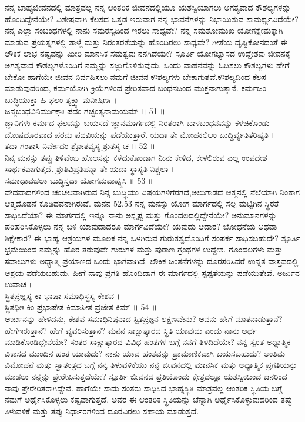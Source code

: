  ನನ್ನ ಬಾಹ್ಯಜೀವನದಲ್ಲಿ ಮಾತ್ರವಲ್ಲ ನನ್ನ ಆಂತರಿಕ ಜೀವನದಲ್ಲಿಯೂ ಯಶಸ್ವಿಯಾಗಲು ಅಗತ್ಯವಾದ ಕೌಶಲ್ಯಗಳನ್ನು ಹೊಂದಿದ್ದೇನೆಯೇ? ವಿಶೇಷವಾಗಿ ಕೆಲಸದ ಒತ್ತಡ ಇರುವಾಗ ನನ್ನ ಭಾವನೆಗಳನ್ನು ನಿಭಾಯಿಸುವ ಸಾಮರ್ಥ್ಯವಿದೆಯೇ? ನನ್ನ ಎಲ್ಲಾ ಸಂಬಂಧಗಳಲ್ಲಿ ನಾನು  ಸಮರಸ್ಯದಿಂದ ಇರಲು ಸಾಧ್ಯವೇ? ನನ್ನ ಸಮತೋಮುಖ ಯೋಗಕ್ಷೇಮಕ್ಕಾಗಿ ಮಾಡುವ ಪ್ರಯತ್ನಗಳಲ್ಲಿ ತಾಳ್ಮೆ ಮತ್ತು ನಿರಂತರತೆಯನ್ನು ಹೊಂದಿರಲು ಸಾಧ್ಯವೇ? ಗೀತೆಯ ದೃಷ್ಟಿಕೋನದಂತೆ ಈ ಲೌಕಿಕ ಲಾಭ ನಷ್ಟವನ್ನು ಮೀರಿ ಮಾನಸಿಕ ಸಮತ್ವವು ನನಗಿದೆಯೇ?
 ಸ್ಪೂರ್ತಿ 
 ಯೋಗಭ್ಯಾಸದ ಉದ್ದೇಶವು ಜೀವನಕ್ಕೆ ಅಗತ್ಯವಾದ ಕೌಶಲ್ಯಗಳೊಂದಿಗೆ ನಮ್ಮನ್ನು ಸಜ್ಜುಗೊಳಿಸುವುದು. ಒಂದು ವಾಹನವನ್ನು ಓಡಿಸಲು ಕೌಶಲ್ಯಗಳು ಹೇಗೆ ಬೇಕೋ ಹಾಗೆಯೇ ಜೀವನ ನಿರ್ವಹಿಸಲು ನಮಗೆ ಜೀವನ ಕೌಶಲ್ಯಗಳು ಬೇಕಾಗುತ್ತವೆ.ಕೌಶಲ್ಯದಿಂದ ಕೆಲಸ ಮಾಡುವುದರಿಂದ, ಕರ್ಮಯೋಗಿ ಕ್ರಿಯೆಗಳಿಂದ ಪ್ರೇರಿತವಾದ ಬಂಧನದಿಂದ ಮುಕ್ತನಾಗುತ್ತಾನೆ.
ಕರ್ಮಜಂ ಬುದ್ಧಿಯುಕ್ತಾ ಹಿ ಫಲಂ ತ್ಯಕ್ತ್ವಾ ಮನೀಷಿಣಃ ।\\
ಜನ್ಮಬಂಧವಿನಿರ್ಮುಕ್ತಾಃ ಪದಂ ಗಚ್ಛಂತ್ಯನಾಮಯಮ್ ॥ 51 ॥\\
 ಜ್ಞಾನಿಗಳು ಕರ್ಮದ ಫಲವನ್ನು ಬಯಸದೆ ಜ್ಞಾನಮಾರ್ಗದಲ್ಲಿ ನಿರತರಾಗಿ ಬಾಳಬಂಧನವನ್ನು ಕಳಚಿಕೊಂಡು ದೋಷದೂರವಾದ ಪರಮ ಪದವಿಯನ್ನು ಪಡೆಯುತ್ತಾರೆ.
ಯದಾ ತೇ ಮೋಹಕಲಿಲಂ ಬುದ್ಧಿರ್ವ್ಯತಿತರಿಷ್ಯತಿ ।\\
ತದಾ ಗಂತಾಸಿ ನಿರ್ವೇದಂ ಶ್ರೋತವ್ಯಸ್ಯ ಶ್ರುತಸ್ಯ ಚ ॥ 52 ॥\\
 ನಿನ್ನ ಮನಸ್ಸು ತಪ್ಪು ತಿಳಿವೆಂಬ ಹೊಲಸನ್ನು ಕಳೆದುಕೊಂಡಾಗ ನೀನು ಕೇಳಿದ, ಕೇಳಲಿರುವ ಎಲ್ಲ ಉಪದೇಶ ಸಾರ್ಥಕವಾಗುತ್ತದೆ.
ಶ್ರುತಿವಿಪ್ರತಿಪನ್ನಾ ತೇ ಯದಾ ಸ್ಥಾಸ್ಯತಿ ನಿಶ್ಚಲಾ ।\\
ಸಮಾಧಾವಚಲಾ ಬುದ್ಧಿಸ್ತದಾ ಯೋಗಮವಾಪ್ಸ್ಯಸಿ ॥ 53 ॥\\
 ವೇದವಾದಗಳಿಂದ ಚಂಚಲವಾಗಿರುವ ನಿನ್ನ ಬುದ್ಧಿಯು ವಿಷಯಗಳಿಗೆರಗದೆ,ಅಲುಗಾಡದೆ ಆತ್ಮನಲ್ಲಿ ನೆಲೆಯಾಗಿ ನಿಂತಾಗ ಆತ್ಮದೊಡನೆ ಕೂಡಿದವನಾಗಿರುವೆ.
ಮನನ 52,53
 ನನ್ನ ಮನಸ್ಸು ಯೋಗ ಮಾರ್ಗದಲ್ಲಿ ಸಲ್ಪ ಮಟ್ಟಿಗಿನ ಸ್ಥಿರತೆ ಸಾಧಿಸಿದೆಯಾ? ಈ ಮಾರ್ಗದಲ್ಲಿ ಇನ್ನೂ ನಾನು ಅಸ್ಪೃಷ್ಟ  ಮತ್ತು ಗೊಂದಲದಲ್ಲಿದ್ದೇನೆಯೇ? ಅನುಮಾನಗಳನ್ನು ಪರಿಹರಿಸಿಕೊಳ್ಳಲು ನನ್ನ ಬಳಿ ಯಾವುದಾದರೂ ಮಾರ್ಗವಿದೆಯೇ? ಯವುದು ಆದಾರ? ಬೋಧನೆಯ ಅಥವಾ ಶಿಕ್ಷೇಕಾರ? ಈ ಭಾಹ್ಯ ಆಶ್ರಯಗಳ ಮೂಲಕ ನನ್ನ ಒಳಗಿರುವ ಗುರುತತ್ವದೊಂದಿಗೆ ಸಂಪರ್ಕ ಸಾಧಿಸಬಹುದೇ?
 ಸ್ಪೂರ್ತಿ 
 ಭ್ರಮೆಯಿಂದ ನಮ್ಮನ್ನು ಹೊರ ತರುವುದೇ ಗುರುಗಳ ಮತ್ತು ಪುರಾಣ ಗ್ರಂಥಗಳ ಉದ್ದೇಶ. ಗೊಂದಲಗಳು ಮತ್ತು ಸವಾಲುಗಳು ಅಧ್ಯಾತ್ಮಿ ಪ್ರಯಾಣದ ಒಂದು ಭಾಗವಾಗಿದೆ. ಲೌಕಿಕ ಚಿಂತನೆಗಳನ್ನು ದೂರಸರಿಸಿದರೆ ಉನ್ನತ ವಾಸ್ತವದಲ್ಲಿ ಆಶ್ರಯ ಪಡೆಯಬಹುದು. ಹೀಗೆ ನಾವು ಪ್ರಗತಿ ಹೊಂದಿದಾಗ ಈ ಮಾರ್ಗದಲ್ಲಿ ಸ್ಪಷ್ಟತೆಯನ್ನು ಪಡೆಯುತ್ತೇವೆ.
ಅರ್ಜುನ ಉವಾಚ ।\\
ಸ್ಥಿತಪ್ರಙ್ಞಸ್ಯ ಕಾ ಭಾಷಾ ಸಮಾಧಿಸ್ಥಸ್ಯ ಕೇಶವ ।\\
ಸ್ಥಿತಧೀಃ ಕಿಂ ಪ್ರಭಾಷೇತ ಕಿಮಾಸೀತ ವ್ರಜೇತ ಕಿಮ್ ॥ 54 ॥\\
 ಅರ್ಜುನನ್ನು ಹೇಳಿದನು,
 ಕೇಶವ ಸಮಾಧಿನಿಷ್ಠನಾದ ಸ್ಟಿತಪ್ರಜ್ಞನ ಲಕ್ಷಣವೇನು? ಅವನು ಹೇಗೆ ಮಾತನಾಡುತ್ತಾನೆ?ಹೇಗೆಇರುತ್ತಾನೆ? ಹೇಗೆ 
ವ್ಯವರಿಸುತ್ತಾನೆ?
ಮನನ 
 ಸಾಕ್ಷಾತ್ಕಾರದ ಸ್ಥಿತಿ ಯಾವುದು ಎಂದು ನಾನು ಅರ್ಥ ಮಾಡಿಕೊಂಡಿದ್ದೇನೆಯೇ? ಸಂತರ ಸಾಕ್ಷಾತ್ಕಾರದ  ವಿವಿಧ ಹಂತಗಳ ಬಗ್ಗೆ ನನಗೆ ತಿಳಿದಿದೆಯೇ? ನನ್ನ ಸ್ವಂತ ಅಧ್ಯಾತ್ಮಿಕ ವಿಕಾಸದ ಮುಂದಿನ ಹಂತ ಯಾವುದು? ನಾನು ಯಾವ ಹಂತವನ್ನು ಪ್ರಾಮಾಣಿಕವಾಗಿ ಬಯಸಬಹುದು? ಅಂತಿಮ ವಿಮೋಚನೆ ಮತ್ತು ಸ್ವಾತಂತ್ರದ ಬಗ್ಗೆ ನನ್ನ ತಿಳುವಳಿಕೆಯು ನನ್ನ ಜೀವನದಲ್ಲಿ ಮಾನಸಿಕ ಮತ್ತು ಅಧ್ಯಾತ್ಮಿಕ ಪ್ರಗತಿಯನ್ನು ಮಾಡಲು  ನನ್ನನ್ನು ಪ್ರೇರೇಪಿಸುತ್ತದೆಯೇ?
 ಸ್ಪೂರ್ತಿ 
 ಜೀವನದ ಪ್ರತಿಯೊಂದು ಕ್ಷೇತ್ರದಲ್ಲೂ ಯಶಸ್ವಿಯಿಂದ ಜನರಿಂದ ನಾವು ಪ್ರೇರೇರಿತರಾಗಿದ್ದೇವೆ. ಹಾಗೆಯೇ ಸಾದು ಸಂತರು ಸಾಧಿಸಿದ ಭಾಹ್ಯಸ್ಥಿತಿ ಮಾತ್ರವಲ್ಲ ಆಂತರಿಕ ಸ್ಥಿತಿಯ ಬಗ್ಗೆ ನಮಗೆ ಅರ್ಥೈಸಿಕೊಳ್ಳಲು ಕಷ್ಟವಾಗುತ್ತದೆ. ಅವರ ಈ ಆಂತರಿಕ ಸ್ಥಿತಿಯನ್ನು ಚೆನ್ನಾಗಿ ಅರ್ಥೈಸಿಕೊಳ್ಳುವುದರಿಂದ ತಪ್ಪು ತಿಳುವಳಿಕೆ ಮತ್ತು ತಪ್ಪು ನಿರ್ಧಾರಗಳಿಂದ ದೂರವಿರಲು ಸಹಾಯ ಮಾಡುತ್ತದೆ.

